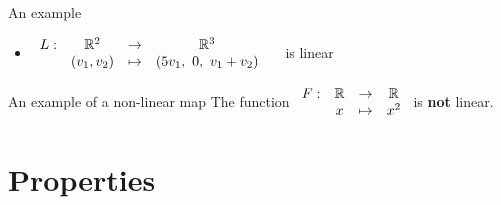 \documentclass{beamer}
\begin{document}
\begin{frame}[t]{An example}
	\begin{itemize}
		\item $\displaystyle
			\begin{array}{cccc}
				L: & \R^2 & \to & \R^3 \\
				   & (v_1,v_2) & \mapsto & (5 v_1, \ 0 , \ v_1 + v_2)
			\end{array}
			$
			\ \ is linear
			\vspace{2cm}
	\end{itemize}
\end{frame}
\begin{frame}[t]{An example of a non-linear map}
		The function \quad $\displaystyle
			\begin{array}{cccc}
				F: & \mathbb{R} & \to & \mathbb{R} \\
				   & x & \mapsto & x^2
			\end{array}
			$
			\quad is \textbf{not} linear.
\end{frame}

\section{Properties}
\end{document}
